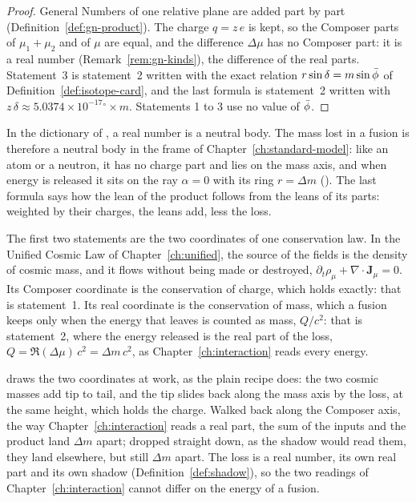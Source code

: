 \begin{proof}
General Numbers of one relative plane are added part by part (Definition~\ref{def:gn-product}). The charge $q = z\,e$ is kept, so the Composer parts of $\mu_1 + \mu_2$ and of $\mu$ are equal, and the difference $\Delta\mu$ has no Composer part: it is a real number (Remark~\ref{rem:gn-kinds}), the difference of the real parts. Statement~3 is statement~2 written with the exact relation $r\sin\delta = m\sin\bar{\phi}$ of Definition~\ref{def:isotope-card}, and the last formula is statement~2 written with $z\,\delta \approx 5.0374 \times 10^{-17}{}^\circ \times m$. Statements 1 to 3 use no value of $\bar{\phi}$.
\end{proof}

In the dictionary of , a real number is a neutral body. The mass lost in a fusion is therefore a neutral body in the frame of Chapter~\ref{ch:standard-model}: like an atom or a neutron, it has no charge part and lies on the mass axis, and when energy is released it sits on the ray $\alpha = 0$ with its ring $r = \Delta m$ (). The last formula says how the lean of the product follows from the leans of its parts: weighted by their charges, the leans add, less the loss.

The first two statements are the two coordinates of one conservation law. In the Unified Cosmic Law of Chapter~\ref{ch:unified}, the source of the fields is the density of cosmic mass, and it flows without being made or destroyed, $\partial_t\rho_\mu + \nabla\cdot\mathbf{J}_\mu = 0$. Its Composer coordinate is the conservation of charge, which holds exactly: that is statement~1. Its real coordinate is the conservation of mass, which a fusion keeps only when the energy that leaves is counted as mass, $Q/c^2$: that is statement~2, where the energy released is the real part of the loss, $Q = \Re(\Delta\mu)\,c^2 = \Delta m\,c^2$, as Chapter~\ref{ch:interaction} reads every energy.

 draws the two coordinates at work, as the plain recipe does: the two cosmic masses add tip to tail, and the tip slides back along the mass axis by the loss, at the same height, which holds the charge. Walked back along the Composer axis, the way Chapter~\ref{ch:interaction} reads a real part, the sum of the inputs and the product land $\Delta m$ apart; dropped straight down, as the shadow would read them, they land elsewhere, but still $\Delta m$ apart. The loss is a real number, its own real part and its own shadow (Definition~\ref{def:shadow}), so the two readings of Chapter~\ref{ch:interaction} cannot differ on the energy of a fusion.

